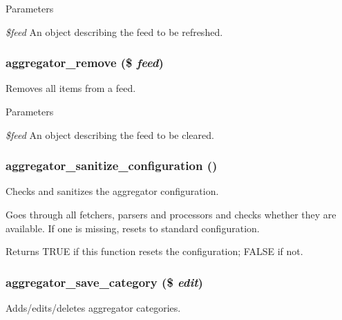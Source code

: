 \begin{DoxyParams}{Parameters}
\item[{\em \$feed}]An object describing the feed to be refreshed. \end{DoxyParams}
\hypertarget{aggregator_8module_ad71e79c625070f7932dc55ca575cae3c}{
\subsubsection[{aggregator\_\-remove}]{\setlength{\rightskip}{0pt plus 5cm}aggregator\_\-remove (\$ {\em feed})}}
\label{aggregator_8module_ad71e79c625070f7932dc55ca575cae3c}
Removes all items from a feed.


\begin{DoxyParams}{Parameters}
\item[{\em \$feed}]An object describing the feed to be cleared. \end{DoxyParams}
\hypertarget{aggregator_8module_af954c80a39d72d63c2f87037351f9d8b}{
\subsubsection[{aggregator\_\-sanitize\_\-configuration}]{\setlength{\rightskip}{0pt plus 5cm}aggregator\_\-sanitize\_\-configuration ()}}
\label{aggregator_8module_af954c80a39d72d63c2f87037351f9d8b}
Checks and sanitizes the aggregator configuration.

Goes through all fetchers, parsers and processors and checks whether they are available. If one is missing, resets to standard configuration.

\begin{DoxyReturn}{Returns}
TRUE if this function resets the configuration; FALSE if not. 
\end{DoxyReturn}
\hypertarget{aggregator_8module_ade5aa9b8b9e6a6cde175f93092c58d3d}{
\subsubsection[{aggregator\_\-save\_\-category}]{\setlength{\rightskip}{0pt plus 5cm}aggregator\_\-save\_\-category (\$ {\em edit})}}
\label{aggregator_8module_ade5aa9b8b9e6a6cde175f93092c58d3d}
Adds/edits/deletes aggregator categories.


